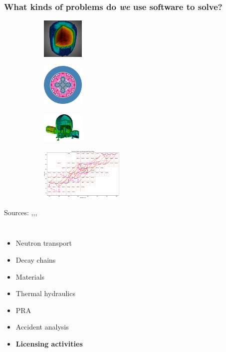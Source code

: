 \begin{frame}
    \frametitle{What kinds of problems do {\it we} use software to solve?}

    \begin{figure}[htpb]
        \begin{subfigure}
            \centering
            \includegraphics[width=2cm]{images/exasmr.png}
        \end{subfigure}
        \begin{subfigure}
           \centering
           \includegraphics[width=2cm]{images/atr.png} 
        \end{subfigure}
        \begin{subfigure}
           \centering
           \includegraphics[width=2cm]{images/hab1.png} 
        \end{subfigure}
        \begin{subfigure}
            \centering
            \includegraphics[width=4cm]{images/transmutation.png}
        \end{subfigure}
    \end{figure}
    \begin{center}
      {\tiny Sources: \cite{exasmr_fig},\cite{openmc_atr_slice},\cite{dagmc_nasa_module},\cite{armi_transmutation_fig}}
    \end{center}
    \pause\medskip
    \begin{columns}
        \column[t]{5cm}
        \begin{itemize}
            \item Neutron transport
            \item Decay chains
            \item Materials
            \item Thermal hydraulics
            \item PRA
            \item Accident analysis
            \item {\bf Licensing activities}
        \end{itemize}


\end{columns}
\end{frame}
